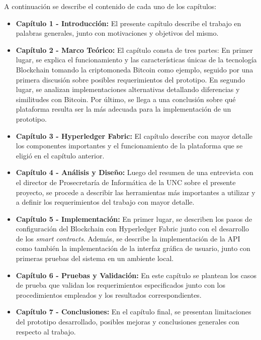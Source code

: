 A continuación se describe el contenido de cada uno de los capítulos: 
\begin{itemize}
    \item \textbf{Capítulo 1 - Introducción: }El presente capítulo describe el trabajo en palabras generales, junto con motivaciones y objetivos del mismo.
    \item \textbf{Capítulo 2 - Marco Teórico: }El capítulo consta de tres partes: En primer lugar, se explica el funcionamiento y las características únicas de la tecnología Blockchain tomando la criptomoneda Bitcoin como ejemplo, seguido por una primera discusión sobre posibles requerimientos del prototipo. En segundo lugar, se analizan implementaciones alternativas detallando diferencias y similitudes con Bitcoin. Por último, se llega a una conclusión sobre qué plataforma resulta ser la más adecuada para la implementación de un prototipo.
    \item \textbf{Capítulo 3 - Hyperledger Fabric: }El capítulo describe con mayor detalle los componentes importantes y el funcionamiento de la plataforma que se eligió en el capítulo anterior.
    \item \textbf{Capítulo 4 - Análisis y Diseño: }Luego del resumen de una entrevista con el director de Prosecretaría de Informática de la UNC sobre el presente proyecto, se procede a describir las herramientas más importantes a utilizar y a definir los requerimientos del trabajo con mayor detalle.
    \item \textbf{Capítulo 5 - Implementación: }En primer lugar, se describen los pasos de configuración del Blockchain con Hyperledger Fabric junto con el desarrollo de los \textit{smart contracts}. Además, se describe la implementación de la API como también la implementación de la interfaz gráfica de usuario, junto con primeras pruebas del sistema en un ambiente local.
    \item \textbf{Capítulo 6 - Pruebas y Validación: }En este capítulo se plantean los casos de prueba que validan los requerimientos especificados junto con los procedimientos empleados y los resultados correspondientes.
    \item \textbf{Capítulo 7 - Conclusiones: }En el capítulo final, se presentan limitaciones del prototipo desarrollado, posibles mejoras y conclusiones generales con respecto al trabajo. 
    
\end{itemize}


\newpage
